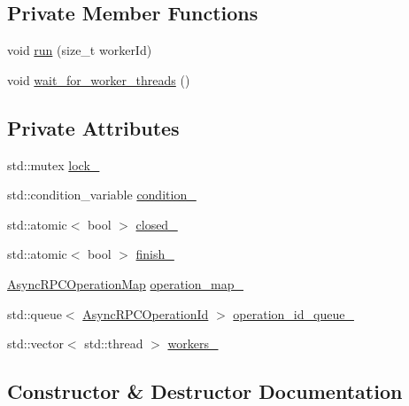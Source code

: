 \subsection*{Private Member Functions}
\begin{DoxyCompactItemize}
\item 
void \mbox{\hyperlink{class_async_r_p_c_queue_ac3d5fdff7da17f6d3e7c431d5a73362f}{run}} (size\+\_\+t worker\+Id)
\item 
void \mbox{\hyperlink{class_async_r_p_c_queue_aa3c4318cddf22d01c67a6f681a631527}{wait\+\_\+for\+\_\+worker\+\_\+threads}} ()
\end{DoxyCompactItemize}
\subsection*{Private Attributes}
\begin{DoxyCompactItemize}
\item 
std\+::mutex \mbox{\hyperlink{class_async_r_p_c_queue_ada16823dc9cf27df1586aefe21202195}{lock\+\_\+}}
\item 
std\+::condition\+\_\+variable \mbox{\hyperlink{class_async_r_p_c_queue_a75c212e637553383b503c0a13f09a921}{condition\+\_\+}}
\item 
std\+::atomic$<$ bool $>$ \mbox{\hyperlink{class_async_r_p_c_queue_ace54c24f087e6738d57cad3581e715fc}{closed\+\_\+}}
\item 
std\+::atomic$<$ bool $>$ \mbox{\hyperlink{class_async_r_p_c_queue_a2f0bd5cb15375855cee1aa1b233669ac}{finish\+\_\+}}
\item 
\mbox{\hyperlink{asyncrpcqueue_8h_a292afad965e96f58aa19082ebf053c1f}{Async\+R\+P\+C\+Operation\+Map}} \mbox{\hyperlink{class_async_r_p_c_queue_a023d022a2e6b584b53e4a72221b5e8e3}{operation\+\_\+map\+\_\+}}
\item 
std\+::queue$<$ \mbox{\hyperlink{asyncrpcoperation_8h_a1fb3337bad8503e6f6823aa1bcd7191c}{Async\+R\+P\+C\+Operation\+Id}} $>$ \mbox{\hyperlink{class_async_r_p_c_queue_ac174a557657529fd20e5369333acc26d}{operation\+\_\+id\+\_\+queue\+\_\+}}
\item 
std\+::vector$<$ std\+::thread $>$ \mbox{\hyperlink{class_async_r_p_c_queue_aa77ac44f05a3b3b5b7a2d54c88248272}{workers\+\_\+}}
\end{DoxyCompactItemize}


\subsection{Constructor \& Destructor Documentation}
\mbox{\label{class_async_r_p_c_queue_a131571f208855382a03c22a98dfceb46}} 
